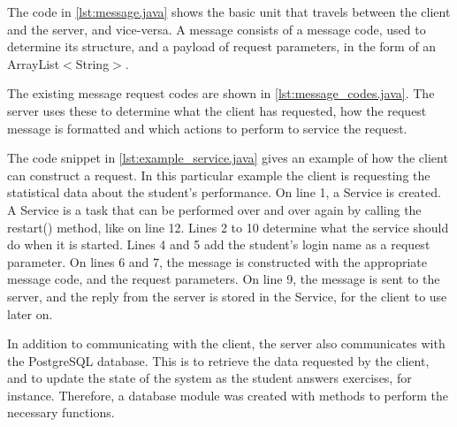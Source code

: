
The code in \ref{lst:message.java} shows the basic unit that travels between the client and the server, and vice-versa. A message consists of a message code, used to determine its structure, and a payload of request parameters, in the form of an \textsf{ArrayList$<$String$>$}.\newline



The existing message request codes are shown in \ref{lst:message_codes.java}. The server uses these to determine what the client has requested, how the request message is formatted and which actions to perform to service the request. \newline



The code snippet in \ref{lst:example_service.java} gives an example of how the client can construct a request. In this particular example the client is requesting the statistical data about the student's performance. On line 1, a \textsf{Service} is created. A \textsf{Service} is a task that can be performed over and over again by calling the \textsf{restart()} method, like on line 12. Lines 2 to 10 determine what the service should do when it is started. Lines 4 and 5 add the student's login name as a request parameter. On lines 6 and 7, the message is constructed with the appropriate message code, and the request parameters. On line 9, the message is sent to the server, and the reply from the server is stored in the \textsf{Service}, for the client to use later on.\newline

In addition to communicating with the client, the server also communicates with the PostgreSQL database. This is to retrieve the data requested by the client, and to update the state of the system as the student answers exercises, for instance. Therefore, a database module was created with methods to perform the necessary functions. \newline



